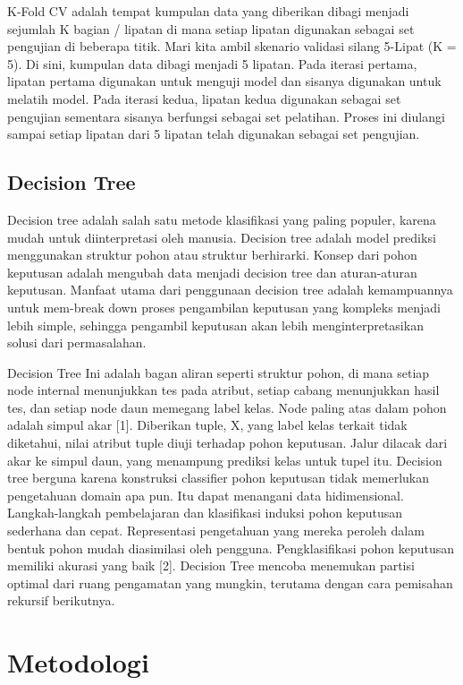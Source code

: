 \documentclass[conference]{IEEEtran}
\begin{document}
K-Fold CV adalah tempat kumpulan data yang diberikan dibagi menjadi sejumlah K bagian / lipatan di mana setiap lipatan digunakan sebagai set pengujian di beberapa titik.  Mari kita ambil skenario validasi silang 5-Lipat (K = 5).  Di sini, kumpulan data dibagi menjadi 5 lipatan.  Pada iterasi pertama, lipatan pertama digunakan untuk menguji model dan sisanya digunakan untuk melatih model.  Pada iterasi kedua, lipatan kedua digunakan sebagai set pengujian sementara sisanya berfungsi sebagai set pelatihan.  Proses ini diulangi sampai setiap lipatan dari 5 lipatan telah digunakan sebagai set pengujian.

\subsection{Decision Tree}
Decision tree adalah salah satu metode klasifikasi yang paling populer, karena mudah untuk diinterpretasi oleh manusia. Decision tree adalah model prediksi menggunakan struktur pohon atau struktur berhirarki. Konsep dari pohon keputusan adalah mengubah data menjadi decision tree dan aturan-aturan keputusan. Manfaat utama dari penggunaan decision tree adalah kemampuannya untuk mem-break down proses pengambilan keputusan yang kompleks menjadi lebih simple, sehingga pengambil keputusan akan lebih menginterpretasikan solusi dari permasalahan.

Decision Tree Ini adalah bagan aliran seperti struktur pohon, di mana setiap node internal menunjukkan tes pada atribut, setiap cabang menunjukkan hasil tes, dan setiap node daun memegang label kelas.  Node paling atas dalam pohon adalah simpul akar [1].  Diberikan tuple, X, yang label kelas terkait tidak diketahui, nilai atribut tuple diuji terhadap pohon keputusan.  Jalur dilacak dari akar ke simpul daun, yang menampung prediksi kelas untuk tupel itu. Decision tree berguna karena konstruksi classifier pohon keputusan tidak memerlukan pengetahuan domain apa pun.  Itu dapat menangani data hidimensional.  Langkah-langkah pembelajaran dan klasifikasi induksi pohon keputusan sederhana dan cepat.  Representasi pengetahuan yang mereka peroleh dalam bentuk pohon mudah diasimilasi oleh pengguna.  Pengklasifikasi pohon keputusan memiliki akurasi yang baik [2].
Decision Tree mencoba menemukan partisi optimal dari ruang pengamatan yang mungkin, terutama dengan cara pemisahan rekursif berikutnya.

\section{Metodologi}
\end{document}
